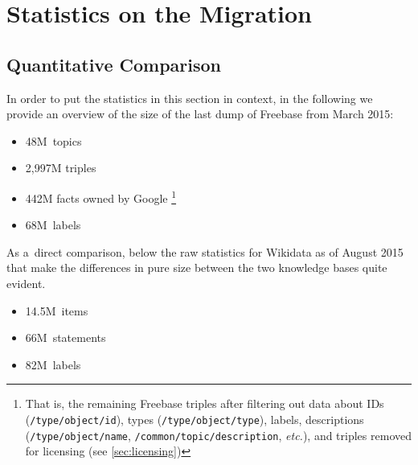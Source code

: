 \documentclass{acm_proc_article-sp}
\begin{document}
\section{Statistics on the Migration}\label{sec:statistics-of-the-migration}

\subsection{Quantitative Comparison}

In order to put the statistics in this section in context,
in the following we provide an overview of the size of the last dump of Freebase
from March 2015:

\begin{itemize}
  \setlength\itemsep{0em}
  \item 48M~topics
  \item 2,997M triples
  \item 442M facts owned by Google%
    \footnote{That is, the remaining Freebase triples
      after filtering out data about IDs (\texttt{/type/object/id}),
      types (\texttt{/type/object/type}), labels, descriptions (\texttt{/type/object/name},
      \texttt{/common/topic/description}, \emph{etc.}), and triples removed
      for licensing (see \autoref{sec:licensing})}
  \item 68M~labels
\end{itemize}

As a~direct comparison, below the raw statistics for Wikidata as of August 2015
that make the differences in pure size between the two knowledge bases quite evident.

\begin{itemize}
    \setlength\itemsep{0em}
    \item 14.5M~items
    \item 66M~statements
    \item 82M~labels
\end{itemize}
\end{document}
